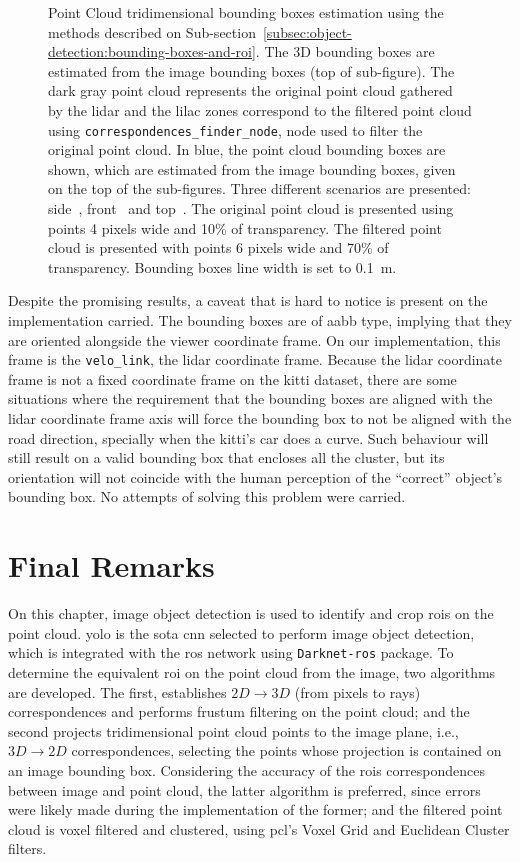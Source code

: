 \begin{figure}[!ht]
	\caption{Point Cloud tridimensional bounding boxes estimation using the methods described on Sub-section~\ref{subsec:object-detection:bounding-boxes-and-roi}. The 3D bounding boxes are estimated from the image bounding boxes (top of sub-figure). The dark gray point cloud represents the original point cloud gathered by the \ac{lidar} and the lilac zones correspond to the filtered point cloud using \texttt{correspondences\_finder\_node}, node used to filter the original point cloud. In blue, the point cloud bounding boxes are shown, which are estimated from the image bounding boxes, given on the top of the sub-figures. Three different scenarios are presented: side~, front~ and top~. The original point cloud is presented using points 4 pixels wide and 10\% of transparency. The filtered point cloud is presented with points 6 pixels wide and 70\% of transparency. Bounding boxes line width is set to \SI{0.1}{\meter}.} 
	\label{fig:bboxes-3d-kitti}
\end{figure}


Despite the promising results, a caveat that is hard to notice is present on the implementation carried. The bounding boxes are of \acl{aabb} type, implying that they are oriented alongside the viewer coordinate frame. On our implementation, this frame is the \texttt{velo\_link}, the \ac{lidar} coordinate frame. Because the \ac{lidar} coordinate frame is not a fixed coordinate frame on the \ac{kitti} dataset, there are some situations where the requirement that the bounding boxes are aligned with the \ac{lidar} coordinate frame axis will force the bounding box to not be aligned with the road direction, specially when the \ac{kitti}'s car does a curve. Such behaviour will still result on a valid bounding box that encloses all the cluster, but its orientation will not coincide with the human perception of the ``correct'' object's bounding box. No attempts of solving this problem were carried. 

\section{Final Remarks}
On this chapter, image object detection is used to identify and crop \aclp{roi} on the point cloud. \ac{yolo} is the \acl{sota} \acl{cnn} selected to perform image object detection, which is integrated with the \ac{ros} network using \texttt{Darknet-ros} package. To determine the equivalent \ac{roi} on the point cloud from the image, two algorithms are developed. The first, establishes $2D \rightarrow 3D$ (from pixels to rays) correspondences and performs frustum filtering on the point cloud; and the second projects tridimensional point cloud points to the image plane, i.e., $3D \rightarrow 2D$ correspondences, selecting the points whose projection is contained on an image bounding box. Considering the accuracy of the \acp{roi} correspondences between image and point cloud, the latter algorithm is preferred, since errors were likely made during the implementation of the former; and the filtered point cloud is voxel filtered and clustered, using \ac{pcl}'s Voxel Grid and Euclidean Cluster filters. 

